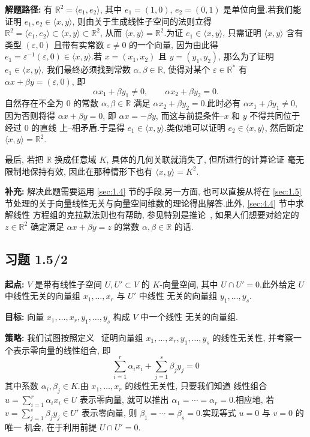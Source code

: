 \noindent\textbf{解题路径:} 有 $\mathbb{R}^2 = \langle e_1, e_2 \rangle$, 其中
$e_1 = (1, 0)$, $e_2 = (0, 1)$ 是单位向量.若我们能证明 $e_1, e_2 \in \langle x, y
\rangle$, 则由关于生成线性子空间的法则立得
$\mathbb{R}^2 = \langle e_1, e_2 \rangle \subset \langle x, y \rangle \subset
\mathbb{R}^2$, 从而 $\langle x, y \rangle = \mathbb{R}^2$.为证
$e_1 \in \langle x, y \rangle$, 只需证明 $\langle x, y \rangle$ 含有类型
$(\varepsilon, 0)$ 且带有实常数 $\varepsilon \neq 0$ 的一个向量, 因为由此得
$e_1 = \varepsilon^{-1}(\varepsilon, 0) \in \langle x, y \rangle$.若
$x = (x_1, x_2)$ 且 $y = (y_1, y_2)$, 那么为了证明 $e_1 \in \langle x, y \rangle$,
我们最终必须找到常数 $\alpha, \beta \in \mathbb{R}$, 使得对某个
$\varepsilon \in \mathbb{R}^*$ 有 $\alpha x + \beta y = (\varepsilon, 0)$, 即
\[
\alpha x_1 + \beta y_1 \neq 0, \qquad \alpha x_2 + \beta y_2 = 0\text{.}
\]
自然存在不全为 $0$ 的常数 $\alpha, \beta \in \mathbb{R}$ 满足 $\alpha x_2 + \beta y_2
= 0$.此时必有 $\alpha x_1 + \beta y_1 \neq 0$, 因为否则将得 $\alpha x + \beta y = 0$,
即 $\alpha x = -\beta y$, 而这与前提条件--$x$ 和 $y$ 不得共同位于经过 $0$ 的直线
上--相矛盾.于是得 $e_1 \in \langle x, y \rangle$.类似地可以证明
$e_2 \in \langle x, y \rangle$, 然后断定 $\langle x, y \rangle = \mathbb{R}^2$.

最后, 若把 $\mathbb{R}$ 换成任意域 $K$, 具体的几何关联就消失了, 但所进行的计算论证
毫无限制地保持有效, 因此在那种情形下也有 $\langle x, y \rangle = K^2$.

\noindent\textbf{补充:} 解决此题需要运用 \ref{sec:1.4} 节的手段.另一方面, 也可以直接从将在
\ref{sec:1.5} 节处理的关于向量线性无关与向量空间维数的理论得出解答.此外, \ref{sec:4.4} 节中求解线性
方程组的克拉默法则也有帮助, 参见特别是推论~, 如果人们想要对给定的
$z \in \mathbb{R}^2$ 确定满足 $\alpha x + \beta y = z$ 的常数 $\alpha, \beta \in
\mathbb{R}$ 的话.

\subsection*{习题 1.5/2}

\noindent\textbf{起点:} $V$ 是带有线性子空间 $U, U' \subset V$ 的 $K$-向量空间, 其中
$U \cap U' = 0$.此外给定 $U$ 中线性无关的向量组 $x_1, \ldots, x_r$ 与 $U'$ 中线性
无关的向量组 $y_1, \ldots, y_s$.

\noindent\textbf{目标:} 向量 $x_1, \ldots, x_r, y_1, \ldots, y_s$ 构成 $V$ 中一个线性
无关的向量组.

\noindent\textbf{策略:} 我们试图按照定义~ 证明向量组
$x_1, \ldots, x_r, y_1, \ldots, y_s$ 的线性无关性, 并考察一个表示零向量的线性组合,
即
\[
\sum_{i=1}^{r} \alpha_i x_i + \sum_{j=1}^{s} \beta_j y_j = 0
\]
其中系数 $\alpha_i, \beta_j \in K$.由 $x_1, \ldots, x_r$ 的线性无关性, 只要我们知道
线性组合 $u = \sum_{i=1}^{r} \alpha_i x_i \in U$ 表示零向量, 就可以推出
$\alpha_1 = \cdots = \alpha_r = 0$.相应地, 若 $v = \sum_{j=1}^{s} \beta_j y_j \in U'$
表示零向量, 则 $\beta_1 = \cdots = \beta_s = 0$.实现等式 $u = 0$ 与 $v = 0$ 的唯一
机会, 在于利用前提 $U \cap U' = 0$.

